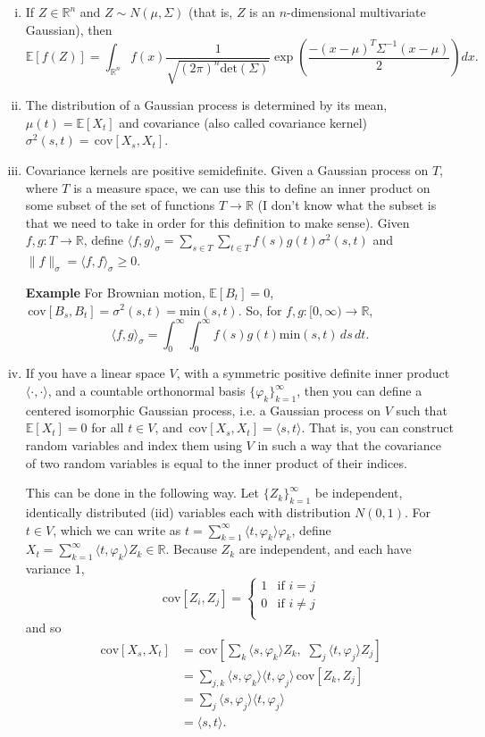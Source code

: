 \documentclass{article}
\theoremstyle{definition}
\newcommand{\E}{\mathbb{E}}
\newcommand{\R}{\mathbb{R}}
\newcommand{\cov}{\,\mathrm{cov}}
\begin{document}
\begin{enumerate}[(i)]

\item If $Z\in\R^n$ and $Z\sim N(\mu,\Sigma)$ (that is, $Z$ is an $n$-dimensional multivariate Gaussian), then \[\E[f(Z)]=\int_{\R^n}f(x)\dfrac{1}{\sqrt{(2\pi)^n\mathrm{det}(\Sigma)}}\exp\left(\dfrac{-(x-\mu)^T\Sigma^{-1}(x-\mu)}{2}\right)dx.\]

\item The distribution of a Gaussian process is determined by its mean, $\mu(t)=\E[X_t]$ and covariance (also called covariance kernel) $\sigma^2(s,t)=\cov[X_s,X_t]$.

\item Covariance kernels are positive semidefinite.  Given a Gaussian process on $T$, where $T$ is a measure space, we can use this to define an inner product on some subset of the set of functions $T\to\R$ (I don't know what the subset is that we need to take in order for this definition to make sense).  Given $f,g:T\to \R$, define $\langle f,g\rangle_{\sigma}=\sum_{s\in T}\sum_{t\in T}f(s)g(t)\sigma^2(s,t)$ and $\|f\|_\sigma=\langle f,f\rangle_\sigma\geq 0$.

\textbf{Example} For Brownian motion, $\E[B_t]=0$, $\cov[B_s,B_t]=\sigma^2(s,t)=\mathrm{min}(s,t)$.  So, for $f,g:[0,\infty)\to\R$, \[\langle f,g\rangle_\sigma=\int_0^\infty\int_0^\infty f(s)g(t)\mathrm{min}(s,t)\,ds\,dt.\]

\item If you have a linear space $V$, with a symmetric positive definite inner product $\langle\cdot,\cdot \rangle$, and a countable orthonormal basis $\{\varphi_k\}_{k=1}^{\infty}$, then you can define a centered isomorphic Gaussian process, i.e. a Gaussian process on $V$ such that $\E[X_t]=0$ for all $t\in V$, and $\cov[X_s,X_t]=\langle s,t\rangle$.  That is, you can construct random variables and index them using $V$ in such a way that the covariance of two random variables is equal to the inner product of their indices.

This can be done in the following way.  Let $\{Z_k\}_{k=1}^\infty$ be independent, identically distributed (iid) variables each with distribution $N(0,1)$.  For $t\in V$, which we can write as $t=\sum_{k=1}^\infty \langle t,\varphi_k\rangle \varphi_k$, define $X_t=\sum_{k=1}^\infty \langle t,\varphi_k\rangle Z_k\in\R$.  Because $Z_k$ are independent, and each have variance $1$, \[\cov[Z_i,Z_j]=\left\{\begin{array}{cc}
1 & \text{if }i=j\\
0 & \text{if }i\neq j\\
\end{array}\right.\]
and so \begin{align*}
\cov[X_s,X_t]&=\cov\left[\sum_k\langle s,\varphi_k\rangle Z_k,\,\,\sum_j\langle t,\varphi_j\rangle Z_j\right]\\
&=\sum_{j,k}\langle s,\varphi_k\rangle \langle t,\varphi_j\rangle \cov[Z_k,Z_j]\\
&=\sum_j\langle s,\varphi_j\rangle \langle t,\varphi_j\rangle\\
&=\langle s,t\rangle.
\end{align*}


\end{enumerate}
\end{document}
